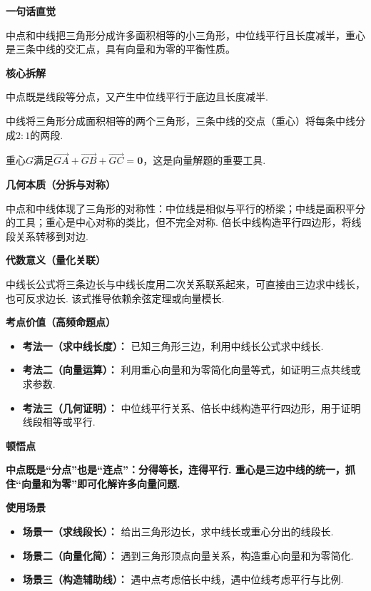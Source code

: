 \begin{explanationbox}
	\textbf{\textcolor{CExplanation}{一句话直觉}}

	中点和中线把三角形分成许多面积相等的小三角形，中位线平行且长度减半，重心是三条中线的交汇点，具有向量和为零的平衡性质。

	\medskip
	\textbf{\textcolor{CExplanation}{核心拆解}}
	\begin{description}[style=nextline, leftmargin=2.8em, labelsep=0.5em, itemsep=0.45em]
		\item[\textbf{要点一（中点双性质）：}] 中点既是线段等分点，又产生中位线平行于底边且长度减半.
		\item[\textbf{要点二（中线与面积）：}] 中线将三角形分成面积相等的两个三角形，三条中线的交点（重心）将每条中线分成$2:1$的两段.
		\item[\textbf{要点三（重心向量特征）：}] 重心$G$满足$\overrightarrow{GA}+\overrightarrow{GB}+\overrightarrow{GC}=\mathbf{0}$，这是向量解题的重要工具.
	\end{description}

	\medskip
	\textbf{\textcolor{CExplanation}{几何本质（分拆与对称）}}

	中点和中线体现了三角形的对称性：中位线是相似与平行的桥梁；中线是面积平分的工具；重心是中心对称的类比，但不完全对称. 倍长中线构造平行四边形，将线段关系转移到对边.

	\medskip
	\textbf{\textcolor{CExplanation}{代数意义（量化关联）}}

	中线长公式将三条边长与中线长度用二次关系联系起来，可直接由三边求中线长，也可反求边长. 该式推导依赖余弦定理或向量模长.

	\medskip
	\textbf{\textcolor{CExplanation}{考点价值（高频命题点）}}
	\begin{itemize}[leftmargin=*, itemsep=0.5em, topsep=0.4em]
		\item \textbf{考法一（求中线长度）：} 已知三角形三边，利用中线长公式求中线长.
		\item \textbf{考法二（向量运算）：} 利用重心向量和为零简化向量等式，如证明三点共线或求参数.
		\item \textbf{考法三（几何证明）：} 中位线平行关系、倍长中线构造平行四边形，用于证明线段相等或平行.
	\end{itemize}

	\medskip
	\textbf{\textcolor{CExplanation}{顿悟点}}

	\textbf{中点既是“分点”也是“连点”：分得等长，连得平行. 重心是三边中线的统一，抓住“向量和为零”即可化解许多向量问题.}

	\medskip
	\textbf{\textcolor{CExplanation}{使用场景}}
	\begin{itemize}[leftmargin=*, itemsep=0.5em, topsep=0.4em]
		\item \textbf{场景一（求线段长）：} 给出三角形边长，求中线长或重心分出的线段长.
		\item \textbf{场景二（向量化简）：} 遇到三角形顶点向量关系，构造重心向量和为零简化.
		\item \textbf{场景三（构造辅助线）：} 遇中点考虑倍长中线，遇中位线考虑平行与比例.
	\end{itemize}
\end{explanationbox}
